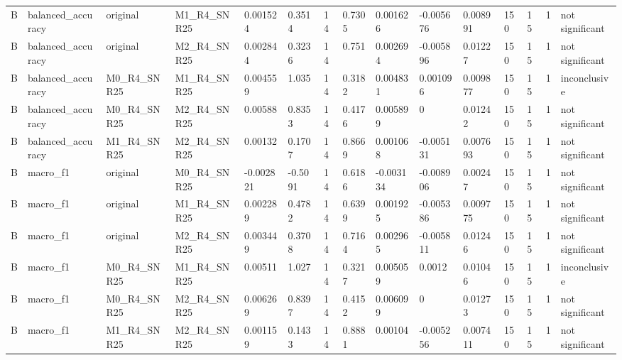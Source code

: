 \begin{tabular}{lllllllllllllll}
B & balanced\_accuracy & original & M1\_R4\_SNR25 & 0.001524 & 0.3514 & 14 & 0.7305 & 0.001626 & -0.005676 & 0.008991 & 150 & 15 & 1 & not significant \\
B & balanced\_accuracy & original & M2\_R4\_SNR25 & 0.002844 & 0.3236 & 14 & 0.751 & 0.002694 & -0.005896 & 0.01227 & 150 & 15 & 1 & not significant \\
B & balanced\_accuracy & M0\_R4\_SNR25 & M1\_R4\_SNR25 & 0.004559 & 1.035 & 14 & 0.3182 & 0.004831 & 0.001096 & 0.009877 & 150 & 15 & 1 & inconclusive \\
B & balanced\_accuracy & M0\_R4\_SNR25 & M2\_R4\_SNR25 & 0.00588 & 0.8353 & 14 & 0.4176 & 0.005899 & 0 & 0.01242 & 150 & 15 & 1 & not significant \\
B & balanced\_accuracy & M1\_R4\_SNR25 & M2\_R4\_SNR25 & 0.00132 & 0.1707 & 14 & 0.8669 & 0.001068 & -0.005131 & 0.007693 & 150 & 15 & 1 & not significant \\
B & macro\_f1 & original & M0\_R4\_SNR25 & -0.002821 & -0.5091 & 14 & 0.6186 & -0.003134 & -0.008906 & 0.00247 & 150 & 15 & 1 & not significant \\
B & macro\_f1 & original & M1\_R4\_SNR25 & 0.002289 & 0.4782 & 14 & 0.6399 & 0.001925 & -0.005386 & 0.009775 & 150 & 15 & 1 & not significant \\
B & macro\_f1 & original & M2\_R4\_SNR25 & 0.003449 & 0.3708 & 14 & 0.7164 & 0.002965 & -0.005811 & 0.01246 & 150 & 15 & 1 & not significant \\
B & macro\_f1 & M0\_R4\_SNR25 & M1\_R4\_SNR25 & 0.00511 & 1.027 & 14 & 0.3217 & 0.005059 & 0.0012 & 0.01046 & 150 & 15 & 1 & inconclusive \\
B & macro\_f1 & M0\_R4\_SNR25 & M2\_R4\_SNR25 & 0.006269 & 0.8397 & 14 & 0.4152 & 0.006099 & 0 & 0.01273 & 150 & 15 & 1 & not significant \\
B & macro\_f1 & M1\_R4\_SNR25 & M2\_R4\_SNR25 & 0.001159 & 0.1433 & 14 & 0.8881 & 0.00104 & -0.005256 & 0.007411 & 150 & 15 & 1 & not significant \\
\hline
\end{tabular}
